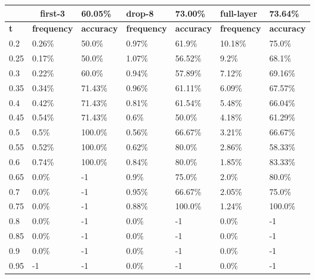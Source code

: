 
\begin{table}[t]
\centering
\begin{tabular}{lllllll}
\hline
\multicolumn{1}{c}{} & \multicolumn{1}{c}{first-3} & \multicolumn{1}{l|}{60.05\%} & drop-8 & \multicolumn{1}{l|}{73.00\%} & full-layer & 73.64\% \\ \hline
\multicolumn{1}{l|}{\textbf{t}} & \textbf{frequency} & \multicolumn{1}{l|}{\textbf{accuracy}} & \textbf{frequency} & \multicolumn{1}{l|}{\textbf{accuracy}} & \textbf{frequency} & \textbf{accuracy} \\ \hline	\multicolumn{1}{l|}{0.2}&  0.26\% & \multicolumn{1}{l|}{50.0\%}& 0.97\% & \multicolumn{1}{l|}{61.9\%}& 10.18\% & 75.0\%\\ 
\multicolumn{1}{l|}{0.25}&  0.17\% & \multicolumn{1}{l|}{50.0\%}& 1.07\% & \multicolumn{1}{l|}{56.52\%}& 9.2\% & 68.1\%\\ 
\multicolumn{1}{l|}{0.3}&  0.22\% & \multicolumn{1}{l|}{60.0\%}& 0.94\% & \multicolumn{1}{l|}{57.89\%}& 7.12\% & 69.16\%\\ 
\multicolumn{1}{l|}{0.35}&  0.34\% & \multicolumn{1}{l|}{71.43\%}& 0.96\% & \multicolumn{1}{l|}{61.11\%}& 6.09\% & 67.57\%\\ 
\multicolumn{1}{l|}{0.4}&  0.42\% & \multicolumn{1}{l|}{71.43\%}& 0.81\% & \multicolumn{1}{l|}{61.54\%}& 5.48\% & 66.04\%\\ 
\multicolumn{1}{l|}{0.45}&  0.54\% & \multicolumn{1}{l|}{71.43\%}& 0.6\% & \multicolumn{1}{l|}{50.0\%}& 4.18\% & 61.29\%\\ 
\multicolumn{1}{l|}{0.5}&  0.5\% & \multicolumn{1}{l|}{100.0\%}& 0.56\% & \multicolumn{1}{l|}{66.67\%}& 3.21\% & 66.67\%\\ 
\multicolumn{1}{l|}{0.55}&  0.52\% & \multicolumn{1}{l|}{100.0\%}& 0.62\% & \multicolumn{1}{l|}{80.0\%}& 2.86\% & 58.33\%\\ 
\multicolumn{1}{l|}{0.6}&  0.74\% & \multicolumn{1}{l|}{100.0\%}& 0.84\% & \multicolumn{1}{l|}{80.0\%}& 1.85\% & 83.33\%\\ 
\multicolumn{1}{l|}{0.65}&  0.0\% & \multicolumn{1}{l|}{-1}& 0.9\% & \multicolumn{1}{l|}{75.0\%}& 2.0\% & 80.0\%\\ 
\multicolumn{1}{l|}{0.7}&  0.0\% & \multicolumn{1}{l|}{-1}& 0.95\% & \multicolumn{1}{l|}{66.67\%}& 2.05\% & 75.0\%\\ 
\multicolumn{1}{l|}{0.75}&  0.0\% & \multicolumn{1}{l|}{-1}& 0.88\% & \multicolumn{1}{l|}{100.0\%}& 1.24\% & 100.0\%\\ 
\multicolumn{1}{l|}{0.8}&  0.0\% & \multicolumn{1}{l|}{-1}& 0.0\% & \multicolumn{1}{l|}{-1}& 0.0\% & -1\\ 
\multicolumn{1}{l|}{0.85}&  0.0\% & \multicolumn{1}{l|}{-1}& 0.0\% & \multicolumn{1}{l|}{-1}& 0.0\% & -1\\ 
\multicolumn{1}{l|}{0.9}&  0.0\% & \multicolumn{1}{l|}{-1}& 0.0\% & \multicolumn{1}{l|}{-1}& 0.0\% & -1\\ 
\multicolumn{1}{l|}{0.95}&  -1 & \multicolumn{1}{l|}{-1}& 0.0\% & \multicolumn{1}{l|}{-1}& 0.0\% & -1\\ 


\end{tabular}
\end{table}

